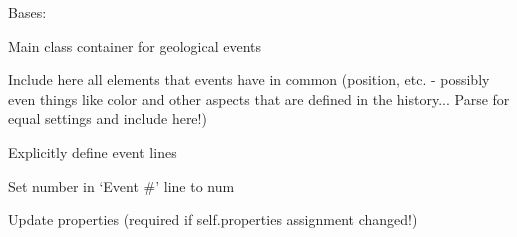 \documentclass[a4paper,10pt,english]{sphinxmanual}
\begin{document}
\begin{fulllineitems}
\label{pynoddy:pynoddy.events.Event}
Bases: 

Main class container for geological events

Include here all elements that events have in common (position, etc. - 
possibly even things like color and other aspects that are defined in the history...
Parse for equal settings and include here!)

\begin{fulllineitems}
\label{pynoddy:pynoddy.events.Event.set_event_lines}
Explicitly define event lines

\end{fulllineitems}


\begin{fulllineitems}
\label{pynoddy:pynoddy.events.Event.set_event_number}
Set number in `Event \#' line to num

\end{fulllineitems}


\begin{fulllineitems}
\label{pynoddy:pynoddy.events.Event.update_properties}
Update properties (required if self.properties assignment changed!)

\end{fulllineitems}


\end{fulllineitems}

\end{document}
